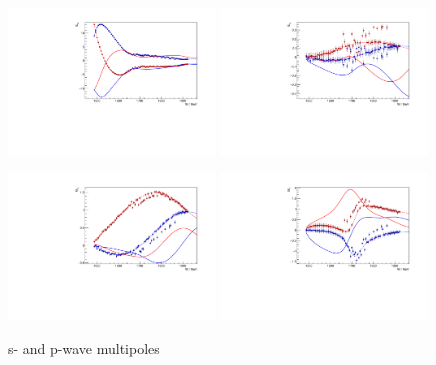 \documentclass[a4paper,12pt]{report}
\begin{document}
\begin{figure}
  \begin{center}
    \centerline{
    \includegraphics[width=0.49\textwidth]{plots.0/E0p.pdf}
    \includegraphics[width=0.49\textwidth]{plots.0/E1p.pdf}
    }
    \centerline{
    \includegraphics[width=0.49\textwidth]{plots.0/M1p.pdf}
    \includegraphics[width=0.49\textwidth]{plots.0/M1m.pdf}
    }
    \caption{s- and p-wave multipoles}
  \end{center}
\end{figure}
\end{document}
